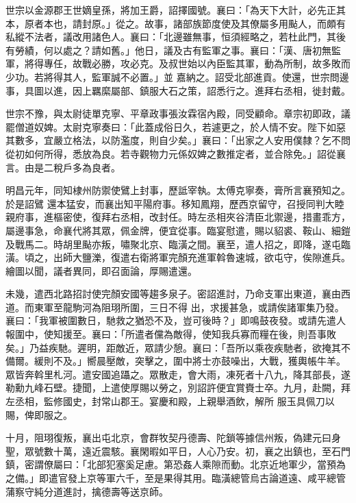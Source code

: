 \begin{pinyinscope}
 世宗以金源郡王世嫡皇孫，將加王爵，詔擇國號。襄曰：「為天下大計，必先正其本，原者本也，請封原。」從之。故事，諸部族節度使及其僚屬多用颭人，而頗有私縱不法者，議改用諸色人。襄曰：「北邊雖無事，恒須經略之，若杜此門，其後有勞績，何以處之？請如舊。」他日，議及古有監軍之事。襄曰：「漢、唐初無監軍，將得專任，故戰必勝，攻必克。及叔世始以內臣監其軍，動為所制，故多敗而少功。若將得其人，監軍誠不必置。」並
 嘉納之。詔受北部進貢。使還，世宗問邊事，具圖以進，因上羈縻屬部、鎮服大石之策，詔悉行之。進拜右丞相，徙封戴。



 世宗不豫，與太尉徒單克寧、平章政事張汝霖宿內殿，同受顧命。章宗初即政，議罷僧道奴婢。太尉克寧奏曰：「此蓋成俗日久，若遽更之，於人情不安。陛下如惡其數多，宜嚴立格法，以防濫度，則自少矣。」襄曰：「出家之人安用僕隸？乞不問從初如何所得，悉放為良。若寺觀物力元係奴婢之數推定者，並合除免。」詔從襄言。由是二稅戶多為良者。



 明昌元年，同知棣州防禦使鷿上封事，歷詆宰執。太傅克寧奏，膏所言襄預知之。於是詔鷿
 還本猛安，而襄出知平陽府事。移知鳳翔，歷西京留守，召授同判大睦親府事，進樞密使，復拜右丞相，改封任。時左丞相夾谷清臣北禦邊，措畫乖方，屬邊事急，命襄代將其眾，佩金牌，便宜從事。臨宴慰遣，賜以貂裘、鞍山、細鎧及戰馬二。時胡里颭亦叛，嘯聚北京、臨潢之間。襄至，遣人招之，即降，遂屯臨潢。頃之，出師大鹽濼，復遣右衛將軍完顏充進軍斡魯速城，欲屯守，俟隙進兵。繪圖以聞，議者異同，即召面論，厚賜遣還。



 未幾，遣西北路招討使完顏安國等趨多泉子。密詔進討，乃命支軍出東道，襄由西道。而東軍至龍駒河為阻珝所圍，三日不得
 出，求援甚急，或請俟諸軍集乃發。襄曰：「我軍被圍數日，馳救之猶恐不及，豈可後時？」即鳴鼓夜發。或請先遣人報圍中，使知援至。襄曰：「所遣者儻為敵得，使知我兵寡而糧在後，則吾事敗矣。」乃益疾馳。遲明，距敵近，眾請少憩。襄曰：「吾所以乘夜疾馳者，欲掩其不備爾。緩則不及。」嚮晨壓敵，突擊之，圍中將士亦鼓噪出，大戰，獲輿帳牛羊。眾皆奔斡里札河。遣安國追躡之。眾散走，會大雨，凍死者十八九，降其部長，遂勒勳九峰石壁。捷聞，上遣使厚賜以勞之，別詔許便宜賞賚士卒。九月，赴闕，拜左丞相，監修國史，封常山郡王。宴慶和殿，上親舉酒飲，解所
 服玉具佩刀以賜，俾即服之。



 十月，阻珝復叛，襄出屯北京，會群牧契丹德壽、陀鎖等據信州叛，偽建元曰身聖，眾號數十萬，遠近震駭。襄閑暇如平日，人心乃安。初，襄之出鎮也，至石門鎮，密謂僚屬曰：「北部犯塞奚足慮。第恐姦人乘隙而動。北京近地軍少，當預為之備。」即遣官發上京等軍六千，至是果得其用。臨潢總管烏古論道遠、咸平總管蒲察守純分道進討，擒德壽等送京師。




\end{pinyinscope}
